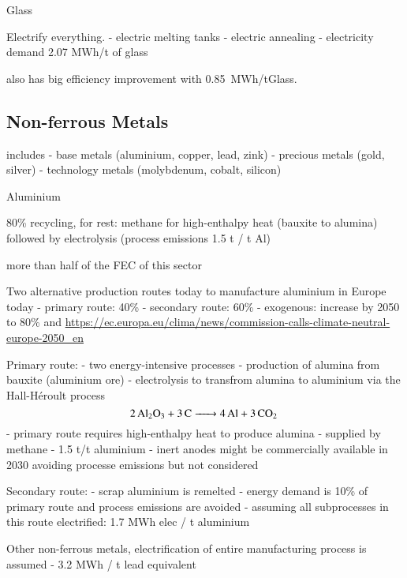 \cite{furszyferdelrioDecarbonizingCeramics2022a}

Glass

Electrify everything.
- electric melting tanks
- electric annealing
- electricity demand 2.07 MWh/t of glass 

\cite{furszyferdelrioDecarbonizingGlass2022}


 also has big efficiency improvement with 0.85~MWh\el/tGlass.

\subsection{Non-ferrous Metals}

includes
- base metals (aluminium, copper, lead, zink)
- precious metals (gold, silver)
- technology metals (molybdenum, cobalt, silicon)

Aluminium

80\% recycling, for rest: methane for high-enthalpy heat (bauxite to alumina) followed by electrolysis (process emissions 1.5 t \co / t Al)

more than half of the FEC of this sector

Two alternative production routes today to manufacture aluminium in Europe today
- primary route: 40\%
- secondary route: 60\%
- exogenous: increase by 2050 to 80\%  and \url{https://ec.europa.eu/clima/news/commission-calls-climate-neutral-europe-2050_en}

Primary route:
- two energy-intensive processes
- production of alumina from bauxite (aluminium ore)
- electrolysis to transfrom alumina to aluminium via the Hall-H\'{e}roult process
\begin{equation}
    \ce{2Al2O3 + 3C -> 4Al + 3\co}
\end{equation}
- primary route requires high-enthalpy heat to produce alumina - supplied by methane
- 1.5 t\co/t aluminium
- inert anodes might be commercially available in 2030 avoiding processe emissions  but not considered

Secondary route:
- scrap aluminium is remelted
- energy demand is 10\% of primary route and process emissions are avoided
- assuming all subprocesses in this route electrified: 1.7 MWh elec / t aluminium

Other non-ferrous metals, electrification of entire manufacturing process is assumed
- 3.2 MWh / t lead equivalent

